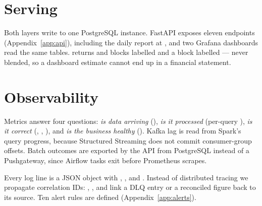 \section{Serving}
\label{sec:impl-serving}
\label{sec:impl-merge}

Both layers write to one PostgreSQL instance. FastAPI exposes eleven
endpoints (Appendix~\ref{app:api}), including the daily report at
, and two Grafana dashboards read the
same tables.  returns  and
 blocks labelled  and a
 block labelled  --- never blended,
so a dashboard estimate cannot end up in a financial statement.

\section{Observability}
\label{sec:impl-observability}
\label{sec:impl-alerting}

Metrics answer four questions: \emph{is data arriving}
(), \emph{is it processed}
(per-query ), \emph{is it
correct} (,
,
), and \emph{is the business
healthy} (). Kafka lag is read from
Spark's query progress, because Structured Streaming does not commit
consumer-group offsets. Batch outcomes are exported by the API from
PostgreSQL instead of a Pushgateway, since Airflow tasks exit before
Prometheus scrapes.

Every log line is a JSON object with , ,
 and . Instead of distributed tracing we
propagate correlation IDs: , ,
 and  link a DLQ entry or a reconciled
figure back to its source. Ten alert rules are defined
(Appendix~\ref{app:alerts}).
